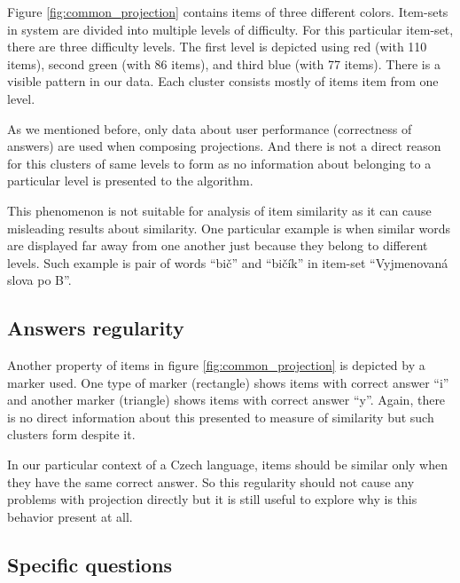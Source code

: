 \documentclass[
  digital, %
  table,   %
  nolof,     %
  nolot,     %
  nocover,
  color,
  final, %
]{fithesis3}
\begin{document}

Figure \ref{fig:common_projection} contains items of three different colors. Item-sets in system \umimeCesky{} are divided into multiple levels of difficulty. For this particular item-set, there are three difficulty levels. The first level is depicted using red (with 110 items), second green (with 86 items), and third blue (with 77 items). There is a  visible pattern in our data. Each cluster consists mostly of items item from one level.

As we mentioned before, only data about user performance (correctness of answers) are used when composing projections. And there is not a direct reason for this clusters of same levels to form as no information about belonging to a particular level is presented to the algorithm.


This phenomenon is not suitable for analysis of item similarity as it can cause misleading results about similarity. One particular example is when similar words are displayed far away from one another just because they belong to different levels. Such example is pair of words ``bič'' and ``bičík'' in item-set ``Vyjmenovaná slova po B''.


\subsection{Answers regularity}\label{answers-regularity}

Another property of items in figure \ref{fig:common_projection} is depicted by a marker used. One type of marker (rectangle) shows items with correct answer ``i'' and another marker (triangle) shows items with correct answer ``y''. Again, there is no direct information about this presented to measure of similarity but such clusters form despite it.

In our particular context of a Czech language, items should be similar only when they have the same correct answer. So this regularity should not cause any problems with projection directly but it is still useful to explore why is this behavior present at all.


\subsection{Specific questions}\label{specific-questions}
\end{document}
